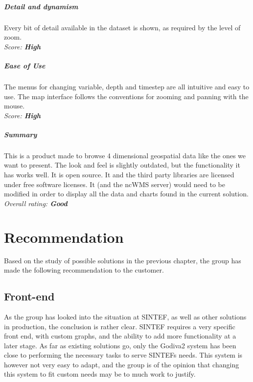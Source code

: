\documentclass[11pt,a4paper,titlepage,oneside]{report}
\begin{document}
	\paragraph{Detail and dynamism}
	Every bit of detail available in the dataset is shown, as required by the level of zoom.
   \\ \emph{Score: \textbf{High}}
	
	\paragraph{Ease of Use}
	The menus for changing variable, depth and timestep are all intuitive and easy to use. The map interface follows the conventions for zooming and panning with the mouse.
   \\ \emph{Score: \textbf{High}}
	
	\paragraph{Summary}
	This is a product made to browse 4 dimensional geospatial data like the ones we want to present. The look and feel is slightly outdated, but the functionality it has works well. It is open source. It and the third party libraries are licensed under free software licenses. It (and the ncWMS server) would need to be modified in order to display all the data and charts found in the current solution.
   \\ \emph{Overall rating: \textbf{Good}}
	

\chapter{Recommendation}
Based on the study of possible solutions in the previous chapter, the group has made the following recommendation to the customer.

\section{Front-end}
As the group has looked into the situation at SINTEF, as well as other solutions in production, the conclusion is rather clear. SINTEF requires a very specific front end, with custom graphs, and the ability to add more functionality at a later stage. As far as existing solutions go, only the Godiva2 system has been close to performing the necessary tasks to serve SINTEFs needs. This system is however not very easy to adapt, and the group is of the opinion that changing this system to fit custom needs may be to much work to justify.
\end{document}
